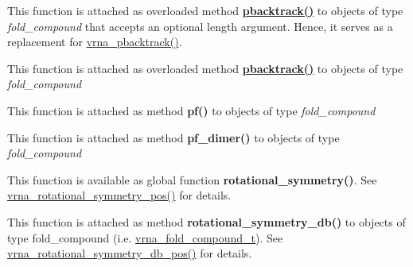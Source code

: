\begin{DoxyRefList}
\item[\label{wrappers__wrappers000093}%
\Hypertarget{wrappers__wrappers000093}%
Global \hyperlink{group__subopt__stochbt_ga901fe42a33b07be083421741bf7dc610}{vrna\+\_\+pbacktrack} (vrna\+\_\+fold\+\_\+compound\+\_\+t $\ast$vc)]This function is attached as overloaded method {\bfseries \hyperlink{group__subopt__stochbt_gac03ca6db186bb3bf0a2a326d7fb3ba03}{pbacktrack()}} to objects of type {\itshape fold\+\_\+compound} that accepts an optional {\ttfamily length} argument. Hence, it serves as a replacement for \hyperlink{group__subopt__stochbt_ga901fe42a33b07be083421741bf7dc610}{vrna\+\_\+pbacktrack()}.  
\item[\label{wrappers__wrappers000092}%
\Hypertarget{wrappers__wrappers000092}%
Global \hyperlink{group__subopt__stochbt_ga347375a4da8bdff74639529847f97d4f}{vrna\+\_\+pbacktrack5} (vrna\+\_\+fold\+\_\+compound\+\_\+t $\ast$vc, int length)]This function is attached as overloaded method {\bfseries \hyperlink{group__subopt__stochbt_gac03ca6db186bb3bf0a2a326d7fb3ba03}{pbacktrack()}} to objects of type {\itshape fold\+\_\+compound}  
\item[\label{wrappers__wrappers000089}%
\Hypertarget{wrappers__wrappers000089}%
Global \hyperlink{group__part__func__global_ga29e256d688ad221b78d37f427e0e99bc}{vrna\+\_\+pf} (vrna\+\_\+fold\+\_\+compound\+\_\+t $\ast$vc, char $\ast$structure)]This function is attached as method {\bfseries pf()} to objects of type {\itshape fold\+\_\+compound}  
\item[\label{wrappers__wrappers000090}%
\Hypertarget{wrappers__wrappers000090}%
Global \hyperlink{group__part__func__global_ga4e5c7d06c302a7c59fc0d64dc142ca63}{vrna\+\_\+pf\+\_\+dimer} (vrna\+\_\+fold\+\_\+compound\+\_\+t $\ast$vc, char $\ast$structure)]This function is attached as method {\bfseries pf\+\_\+dimer()} to objects of type {\itshape fold\+\_\+compound}  
\item[\label{wrappers__wrappers000006}%
\Hypertarget{wrappers__wrappers000006}%
Global \hyperlink{group__combinatorics__utils_gae1dec02c4b63f303ce06a9293d316762}{vrna\+\_\+rotational\+\_\+symmetry} (const char $\ast$string)]This function is available as global function {\bfseries rotational\+\_\+symmetry()}. See \hyperlink{group__combinatorics__utils_ga294d48935fcac87ab335d771fe289ecb}{vrna\+\_\+rotational\+\_\+symmetry\+\_\+pos()} for details.  
\item[\label{wrappers__wrappers000008}%
\Hypertarget{wrappers__wrappers000008}%
Global \hyperlink{group__combinatorics__utils_gad42ffd53025bed9d636d811748db7c5a}{vrna\+\_\+rotational\+\_\+symmetry\+\_\+db} (vrna\+\_\+fold\+\_\+compound\+\_\+t $\ast$fc, const char $\ast$structure)]This function is attached as method {\bfseries rotational\+\_\+symmetry\+\_\+db()} to objects of type {\ttfamily fold\+\_\+compound} (i.\+e. \hyperlink{group__fold__compound_ga1b0cef17fd40466cef5968eaeeff6166}{vrna\+\_\+fold\+\_\+compound\+\_\+t}). See \hyperlink{group__combinatorics__utils_ga2a4227ebe28dbc7ad55444a3a1bf7119}{vrna\+\_\+rotational\+\_\+symmetry\+\_\+db\+\_\+pos()} for details.  

\end{DoxyRefList}
